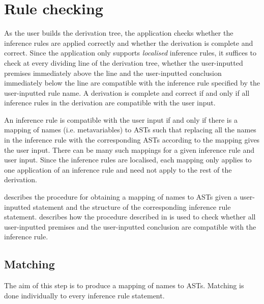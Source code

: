 \chapter{Rule checking}
\label{chapter:checking}
As the user builds the derivation tree, the application checks whether the inference rules are applied correctly and whether the derivation is complete and correct. Since the application only supports \textit{localised} inference rules, it suffices to check at every dividing line of the derivation tree, whether the user-inputted premises immediately above the line and the user-inputted conclusion immediately below the line are compatible with the inference rule specified by the user-inputted rule name. A derivation is complete and correct if and only if all inference rules in the derivation are compatible with the user input.

An inference rule is compatible with the user input if and only if there is a mapping of names (i.e. metavariables) to ASTs such that replacing all the names in the inference rule with the corresponding ASTs according to the mapping gives the user input. There can be many such mappings for a given inference rule and user input. Since the inference rules are localised, each mapping only applies to one application of an inference rule and need not apply to the rest of the derivation.

 describes the procedure for obtaining a mapping of names to ASTs given a user-inputted statement and the structure of the corresponding inference rule statement.  describes how the procedure described in  is used to check whether all user-inputted premises and the user-inputted conclusion are compatible with the inference rule.

\section{Matching}
\label{checking:matching}
The aim of this step is to produce a mapping of names to ASTs. Matching is done individually to every inference rule statement.

